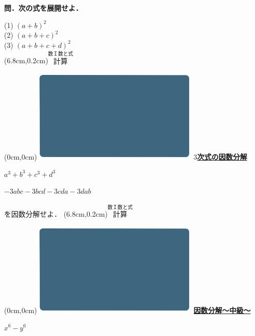 \documentclass[10pt,
fleqn,
dvipdfmx,
uplatex
]{jsarticle}
\begin{document}
\large 
\bf\boldmath 問．次の式を展開せよ．

\LARGE 
\vspace{-0.3zw}
(1)  $\left(a+b\right)^2$\\
(2)  $\left(a+b+c\right)^2$\\
(3)  $\left(a+b+c+d\right)^2$\\

\at(6.8cm,0.2cm){\small\color{bradorange}$\overset{\text{数Ｉ数と式}}{\text{計算}}$}


\newpage



\at(0cm,0cm){\includegraphics[width=8cm,bb=0 0 1920 1080]{./thumbnails/templates/smart_background/数I数と式.jpeg}}
{\color{orange}\bf\boldmath\huge\underline{$3$次式の因数分解}}\vspace{0.5zw}

\LARGE 
\bf\boldmath $a^3+b^3+c^3+d^3$

\Large
\hfill $-3abc-3bcd-3cda-3dab$

\Large
\vspace{1zw}
\hfill を因数分解せよ．
\at(6.8cm,0.2cm){\small\color{bradorange}$\overset{\text{数Ｉ数と式}}{\text{計算}}$}


\newpage



\at(0cm,0cm){\includegraphics[width=8cm,bb=0 0 1920 1080]{./thumbnails/templates/smart_background/数I数と式.jpeg}}
{\color{orange}\bf\boldmath\huge\underline{因数分解〜中級〜}}\vspace{0.5zw}

\HUGE 
\bf\boldmath 
\hspace{2zw}$x^6-y^6$
\end{document}
